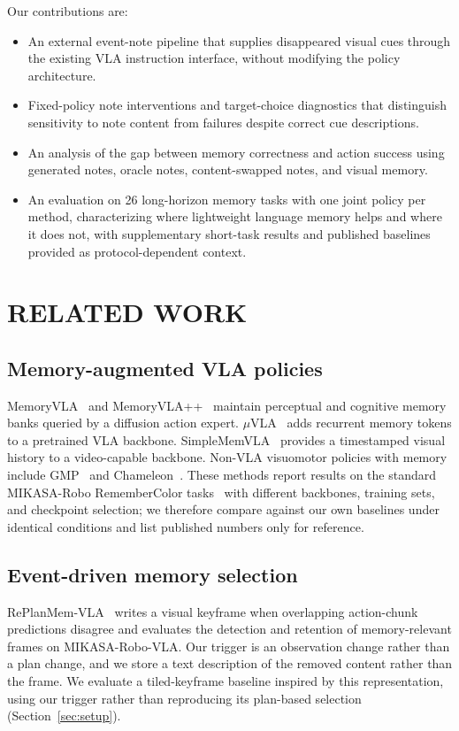 \documentclass{IJCAS}
\begin{document}
Our contributions are:
\begin{itemize}
\item An external event-note pipeline that supplies disappeared visual cues through the existing VLA instruction interface, without modifying the policy architecture.
\item Fixed-policy note interventions and target-choice diagnostics that distinguish sensitivity to note content from failures despite correct cue descriptions.
\item An analysis of the gap between memory correctness and action success using generated notes, oracle notes, content-swapped notes, and visual memory.
\item An evaluation on 26 long-horizon memory tasks with one joint policy per method, characterizing where lightweight language memory helps and where it does not, with supplementary short-task results and published baselines provided as protocol-dependent context.
\end{itemize}

\section{RELATED WORK}
\subsection{Memory-augmented VLA policies}
MemoryVLA~\cite{memoryvla} and MemoryVLA++~\cite{memoryvlapp} maintain perceptual and cognitive memory banks queried by a diffusion action expert. $\mu$VLA~\cite{muvla} adds recurrent memory tokens to a pretrained VLA backbone. SimpleMemVLA~\cite{simplememvla} provides a timestamped visual history to a video-capable backbone. Non-VLA visuomotor policies with memory include GMP~\cite{gmp} and Chameleon~\cite{chameleon}. These methods report results on the standard MIKASA-Robo RememberColor tasks~\cite{mikasa} with different backbones, training sets, and checkpoint selection; we therefore compare against our own baselines under identical conditions and list published numbers only for reference.

\subsection{Event-driven memory selection}
RePlanMem-VLA~\cite{replanmem} writes a visual keyframe when overlapping action-chunk predictions disagree and evaluates the detection and retention of memory-relevant frames on MIKASA-Robo-VLA. Our trigger is an observation change rather than a plan change, and we store a text description of the removed content rather than the frame. We evaluate a tiled-keyframe baseline inspired by this representation, using our trigger rather than reproducing its plan-based selection (Section~\ref{sec:setup}).
\end{document}
